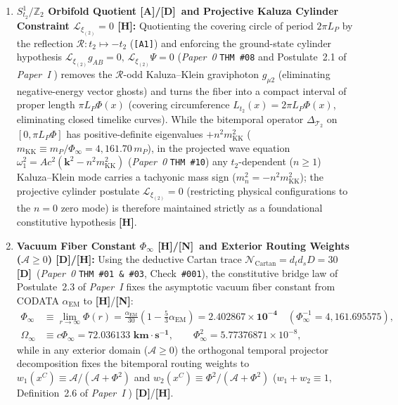 \documentclass[11pt,a4paper]{article}
\newcommand{\catA}{\textbf{\textcolor{purple!80!black}{[A]}}}
\newcommand{\catD}{\textbf{\textcolor{blue!75!black}{[D]}}}
\newcommand{\catH}{\textbf{\textcolor{orange!85!black}{[H]}}}
\newcommand{\catN}{\textbf{\textcolor{teal!75!black}{[N]}}}
\theoremstyle{plain}
\theoremstyle{definition}
\theoremstyle{remark}
\numberwithin{equation}{section}
\begin{document}
\begin{enumerate}
    \item \textbf{$S^1_{t_2}/\mathbb{Z}_2$ Orbifold Quotient \catA/\catD\ and Projective Kaluza Cylinder Constraint $\mathcal{L}_{\xi_{(2)}} = 0$ \catH:} Quotienting the covering circle of period $2\pi L_P$ by the reflection $\mathcal{R}: t_2 \mapsto -t_2$ (\texttt{[A1]}) and enforcing the ground-state cylinder hypothesis $\mathcal{L}_{\xi_{(2)}}g_{AB} = 0, \, \mathcal{L}_{\xi_{(2)}}\Psi = 0$ (\textit{Paper~0} \texttt{THM~\#08} \cite{jimenez2026_p0} and Postulate~2.1 of \textit{Paper~I} \cite{jimenez2026a}) removes the $\mathcal{R}$-odd Kaluza--Klein graviphoton $g_{\mu 2}$ (eliminating negative-energy vector ghosts) and turns the fiber into a compact interval of proper length $\pi L_P\Phi(x)$ (covering circumference $L_{t_2}(x) = 2\pi L_P\Phi(x)$, eliminating closed timelike curves). While the bitemporal operator $\Delta_{\mathcal{T}_2}$ on $[0, \pi L_P\Phi]$ has positive-definite eigenvalues $+n^2 m_{\text{KK}}^2$ ($m_{\text{KK}} \equiv m_P/\Phi_{\infty} = 4{,}161.70\,m_P$), in the projected wave equation $\omega_1^2 = A c^2(\bm{k}^2 - n^2 m_{\text{KK}}^2)$ (\textit{Paper~0} \texttt{THM~\#10}) any $t_2$-dependent ($n \ge 1$) Kaluza--Klein mode carries a tachyonic mass sign ($m_n^2 = -n^2 m_{\text{KK}}^2$); the projective cylinder postulate $\mathcal{L}_{\xi_{(2)}} = 0$ (restricting physical configurations to the $n = 0$ zero mode) is therefore maintained strictly as a foundational constitutive hypothesis \catH.

    \item \textbf{Vacuum Fiber Constant $\Phi_{\infty}$ \catH/\catN\ and Exterior Routing Weights ($\mathcal{A} \ge 0$) \catD/\catH:} Using the deductive Cartan trace $\mathcal{N}_{\text{Cartan}} = d_t d_s D = 30$ \catD\ (\textit{Paper~0} \texttt{THM~\#01 \& \#03}, Check~\texttt{\#001}), the constitutive bridge law of Postulate~2.3 of \textit{Paper~I} \cite{jimenez2026a} fixes the asymptotic vacuum fiber constant from CODATA $\alpha_{\text{EM}}$ to \catH/\catN:
    \begin{align}
    \Phi_{\infty} &\equiv \lim_{r \to \infty} \Phi(r) = \frac{\alpha_{\text{EM}}}{30}\left(1 - \frac{5}{3}\alpha_{\text{EM}}\right) = \mathbf{2.402867 \times 10^{-4}} \quad \left(\Phi_{\infty}^{-1} = 4{,}161.695575\right), \nonumber \\[3pt]
    \Omega_{\infty} &\equiv c\Phi_{\infty} = \mathbf{72.036133\text{ km}\cdot\text{s}^{-1}}, \qquad \Phi_{\infty}^2 = 5.77376871 \times 10^{-8},
    \label{eq:fundamental_cbg_constant}
    \end{align}
    while in any exterior domain ($\mathcal{A} \ge 0$) the orthogonal temporal projector decomposition fixes the bitemporal routing weights to $w_1(x^C) \equiv \mathcal{A}/(\mathcal{A} + \Phi^2)$ and $w_2(x^C) \equiv \Phi^2/(\mathcal{A} + \Phi^2)$ ($w_1 + w_2 \equiv 1$, Definition~2.6 of \textit{Paper~I} \cite{jimenez2026a}) \catD/\catH.


\end{enumerate}
\end{document}
